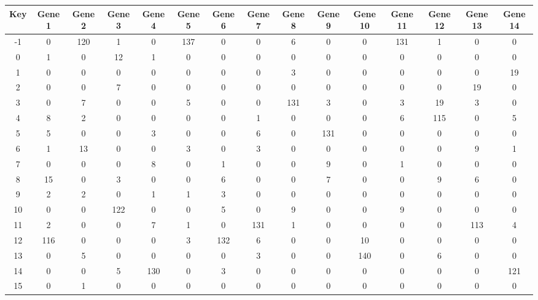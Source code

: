 \begin{tabular}{|c|c|c|c|c|c|c|c|c|c|c|c|c|c|c|}
\hline
Key & Gene 1 & Gene 2 & Gene 3 & Gene 4 & Gene 5 & Gene 6 & Gene 7 & Gene 8 & Gene 9 & Gene 10 & Gene 11 & Gene 12 & Gene 13 & Gene 14 \\
\hline
-1 & 0 & 120 & 1 & 0 & 137 & 0 & 0 & 6 & 0 & 0 & 131 & 1 & 0 & 0 \\
0 & 1 & 0 & 12 & 1 & 0 & 0 & 0 & 0 & 0 & 0 & 0 & 0 & 0 & 0 \\
1 & 0 & 0 & 0 & 0 & 0 & 0 & 0 & 3 & 0 & 0 & 0 & 0 & 0 & 19 \\
2 & 0 & 0 & 7 & 0 & 0 & 0 & 0 & 0 & 0 & 0 & 0 & 0 & 19 & 0 \\
3 & 0 & 7 & 0 & 0 & 5 & 0 & 0 & 131 & 3 & 0 & 3 & 19 & 3 & 0 \\
4 & 8 & 2 & 0 & 0 & 0 & 0 & 1 & 0 & 0 & 0 & 6 & 115 & 0 & 5 \\
5 & 5 & 0 & 0 & 3 & 0 & 0 & 6 & 0 & 131 & 0 & 0 & 0 & 0 & 0 \\
6 & 1 & 13 & 0 & 0 & 3 & 0 & 3 & 0 & 0 & 0 & 0 & 0 & 9 & 1 \\
7 & 0 & 0 & 0 & 8 & 0 & 1 & 0 & 0 & 9 & 0 & 1 & 0 & 0 & 0 \\
8 & 15 & 0 & 3 & 0 & 0 & 6 & 0 & 0 & 7 & 0 & 0 & 9 & 6 & 0 \\
9 & 2 & 2 & 0 & 1 & 1 & 3 & 0 & 0 & 0 & 0 & 0 & 0 & 0 & 0 \\
10 & 0 & 0 & 122 & 0 & 0 & 5 & 0 & 9 & 0 & 0 & 9 & 0 & 0 & 0 \\
11 & 2 & 0 & 0 & 7 & 1 & 0 & 131 & 1 & 0 & 0 & 0 & 0 & 113 & 4 \\
12 & 116 & 0 & 0 & 0 & 3 & 132 & 6 & 0 & 0 & 10 & 0 & 0 & 0 & 0 \\
13 & 0 & 5 & 0 & 0 & 0 & 0 & 3 & 0 & 0 & 140 & 0 & 6 & 0 & 0 \\
14 & 0 & 0 & 5 & 130 & 0 & 3 & 0 & 0 & 0 & 0 & 0 & 0 & 0 & 121 \\
15 & 0 & 1 & 0 & 0 & 0 & 0 & 0 & 0 & 0 & 0 & 0 & 0 & 0 & 0 \\
\hline
\end{tabular}